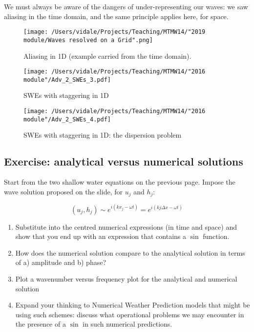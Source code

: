 We must always be aware of the dangers of under-representing our waves: we saw aliasing in the time domain, and the same principle applies here, for space.

\begin{figure}[h!]
	\texttt{[image: /Users/vidale/Projects/Teaching/MTMW14/"2019 module/Waves resolved on a Grid".png]}
	\label{fig:Spherical-PEs2}
	\caption{\label{fig:blue_rectangle} Aliasing in 1D (example carried from the time domain).}
\end{figure}

\begin{figure}[h!]
\texttt{[image: /Users/vidale/Projects/Teaching/MTMW14/"2016 module"/Adv\_2\_SWEs\_3.pdf]}
\label{fig:Spherical-PEs2}
\caption{\label{fig:blue_rectangle} SWEs with staggering in 1D}
\end{figure}

\begin{figure}[h!]
\texttt{[image: /Users/vidale/Projects/Teaching/MTMW14/"2016 module"/Adv\_2\_SWEs\_4.pdf]}
\label{fig:Spherical-PEs2}
\caption{\label{fig:blue_rectangle} SWEs with staggering in 1D: the dispersion problem}
\end{figure}

\subsection{Exercise: analytical versus numerical solutions} 

Start from the two shallow water equations on the previous page. Impose the wave solution proposed on the slide, for $u_j$ and $h_j$: 

\begin{equation}
	(u_j,h_j) \sim e^{i(k x_j -\omega t)} = e^{i(k j \Delta x -\omega t)}
\end{equation}

\begin{enumerate}
	\item Substitute into the centred numerical expressions (in time and space) and show that you end up with an expression that contains a $\sin$ function.
	\item How does the numerical solution compare to the analytical solution in terms of a) amplitude and b) phase?
	\item Plot a wavenumber versus frequency plot for the analytical and numerical solution
	\item Expand your thinking to Numerical Weather Prediction models that might be using such schemes: discuss what operational problems we may encounter in the presence of a $\sin$ in such numerical predictions.
\end{enumerate}

